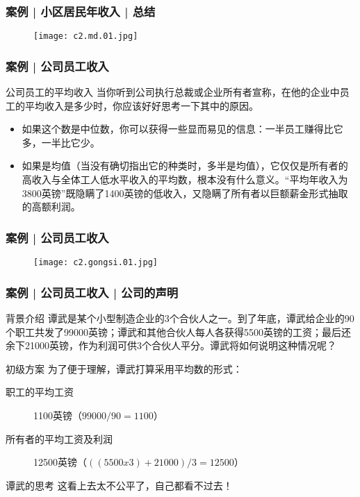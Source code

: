 \begin{frame}
  \frametitle{案例 | 小区居民年收入 | 总结}
  \begin{figure}
    \centering
    \texttt{[image: c2.md.01.jpg]}
  \end{figure}
\end{frame}

\begin{frame}
  \frametitle{案例 | 公司员工收入}
  \begin{block}{公司员工的平均收入}
    当你听到公司执行总裁或企业所有者宣称，在他的企业中员工的平均收入是多少时，你应该好好思考一下其中的原因。
    \begin{itemize}
      \item 如果这个数是中位数，你可以获得一些显而易见的信息：一半员工赚得比它多，一半比它少。
      \item 如果是均值（当没有确切指出它的种类时，多半是均值），它仅仅是所有者的高收入与全体工人低水平收入的平均数，根本没有什么意义。“平均年收入为3800英镑”既隐瞒了1400英镑的低收入，又隐瞒了所有者以巨额薪金形式抽取的高额利润。
    \end{itemize}
  \end{block}
\end{frame}

\begin{frame}
  \frametitle{案例 | 公司员工收入}
  \begin{figure}
    \centering
    \texttt{[image: c2.gongsi.01.jpg]}
  \end{figure}
\end{frame}

\begin{frame}
  \frametitle{案例 | 公司员工收入 | 公司的声明}
  \begin{block}{背景介绍}
谭武是某个小型制造企业的3个合伙人之一。到了年底，谭武给企业的90个职工共发了99000英镑；谭武和其他合伙人每人各获得5500英镑的工资；最后还余下21000英镑，作为利润可供3个合伙人平分。谭武将如何说明这种情况呢？
  \end{block}
  \pause \pause \pause \pause
  \begin{block}{初级方案}
    为了便于理解，谭武打算采用平均数的形式：
    \begin{description}
      \item[职工的平均工资] 1100英镑（$99000 / 90 = 1100$）
      \item[所有者的平均工资及利润] 12500英镑（$((5500 x 3) + 21000) / 3 = 12500$）
    \end{description}
  \end{block}
  \pause
  \begin{block}{谭武的思考}
    这看上去太不公平了，自己都看不过去！
  \end{block}
\end{frame}

